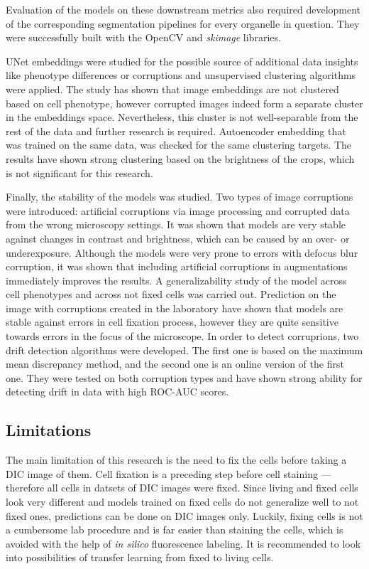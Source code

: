 Evaluation of the models on these downstream metrics also required  development of the corresponding segmentation pipelines for every organelle in question. They were successfully built with the OpenCV and \textit{skimage} libraries. 

UNet embeddings were studied for the possible source of additional data insights like phenotype differences or corruptions and unsupervised clustering algorithms were applied. The study has shown that image embeddings are not clustered based on cell phenotype, however corrupted images indeed form a separate cluster in the embeddings space. Nevertheless, this cluster is not well-separable from the rest of the data and further research is required. Autoencoder embedding that was trained on the same data, was checked for the same clustering targets. The results have shown strong clustering based on the brightness of the crops, which is not significant for this research.

Finally, the stability of the models was studied. Two types of image corruptions were introduced: artificial corruptions via image processing and corrupted data from the wrong microscopy settings. It was shown that models are very stable against changes in contrast and brightness, which can be caused by an over- or underexposure. Although the models were very prone to errors with defocus blur corruption, it was shown that including artificial corruptions in augmentations immediately improves the results. A generalizability study of the model across cell phenotypes and across not fixed cells was carried out. Prediction on the image with corruptions created in the laboratory have shown that models are stable against errors in cell fixation process, however they are quite sensitive towards errors in the focus of the microscope. In order to detect corruprions, two drift detection algorithms were developed. The first one is based on the maximum mean discrepancy method, and the second one is an online version of the first one. They were tested on both corruption types and have shown strong ability for detecting drift in data with high ROC-AUC scores.
  
\subsection{Limitations}
The main limitation of this research is the need to fix the cells before taking a DIC image of them. Cell fixation is a preceding step before cell staining --- therefore all cells in datsets of DIC images were fixed. Since living and fixed cells look very different and models trained on fixed cells do not generalize well to not fixed ones, predictions can be done on DIC images only. Luckily, fixing cells is not a cumbersome lab procedure and is far easier than staining the cells, which is avoided with the help of \textit{in silico} fluorescence labeling. It is recommended to look into possibilities of transfer learning from fixed to living cells.  

